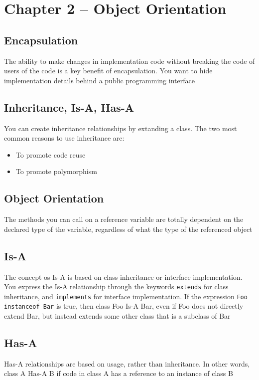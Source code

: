 \section{Chapter 2 -- Object Orientation}
\subsection{Encapsulation}
The ability to make changes in implementation code without breaking the code of 
users of the code is a key benefit of encapsulation. You want to hide 
implementation details behind a public programming interface

\subsection{Inheritance, Is-A, Has-A}
You can create inheritance relationships by extanding a class. The two most 
common reasons to use inheritance are:
\begin{itemize}
    \item To promote code reuse
    \item To promote polymorphism
\end{itemize}

\subsection{Object Orientation}
The methods you can call on a reference variable are totally dependent on the 
declared type of the variable, regardless of what the type of the referenced 
object

\subsection{Is-A}
The concept os Is-A is based on class inheritance or interface implementation.  
You express the Is-A relationship through the keywords \verb#extends# for class 
inheritance, and \verb#implements# for interface implementation. If the 
expression \verb#Foo instanceof Bar# is true, then class Foo Is-A Bar, even if 
Foo does not directly extend Bar, but instead extends some other class that is 
a subclass of Bar

\subsection{Has-A}
Has-A relationships are based on usage, rather than inheritance. In other 
words, class A Has-A B if code in class A has a reference to an instance of 
class B

